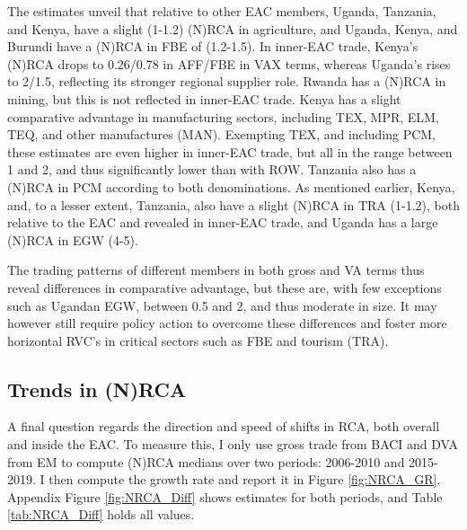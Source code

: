 \documentclass[a4paper]{article}
\begin{document}
The estimates unveil that relative to other EAC members, Uganda, Tanzania, and Kenya, have a slight (1-1.2) (N)RCA in agriculture, and Uganda, Kenya, and Burundi have a (N)RCA in FBE of (1.2-1.5). In inner-EAC trade, Kenya's (N)RCA drops to 0.26/0.78 in AFF/FBE in VAX terms, whereas Uganda's rises to 2/1.5, reflecting its stronger regional supplier role. Rwanda has a (N)RCA in mining, but this is not reflected in inner-EAC trade. Kenya has a slight comparative advantage in manufacturing sectors, including TEX, MPR, ELM, TEQ, and other manufactures (MAN). Exempting TEX, and including PCM, these estimates are even higher in inner-EAC trade, but all in the range between 1 and 2, and thus significantly lower than with ROW. Tanzania also has a (N)RCA in PCM according to both denominations. As mentioned earlier, Kenya, and, to a lesser extent, Tanzania, also have a slight (N)RCA in TRA (1-1.2), both relative to the EAC and revealed in inner-EAC trade, and Uganda has a large (N)RCA in EGW (4-5). \newline

The trading patterns of different members in both gross and VA terms thus reveal differences in comparative advantage, but these are, with few exceptions such as Ugandan EGW, between 0.5 and 2, and thus moderate in size. It may however still require policy action to overcome these differences and foster more horizontal RVC's in critical sectors such as FBE and tourism (TRA). 

\subsection{Trends in (N)RCA}

A final question regards the direction and speed of shifts in RCA, both overall and inside the EAC. To measure this, I only use gross trade from BACI and DVA from EM to compute (N)RCA medians over two periods: 2006-2010 and 2015-2019. I then compute the growth rate and report it in Figure \ref{fig:NRCA_GR}. Appendix Figure \ref{fig:NRCA_Diff} shows estimates for both periods, and Table \ref{tab:NRCA_Diff} holds all values. 
\end{document}
